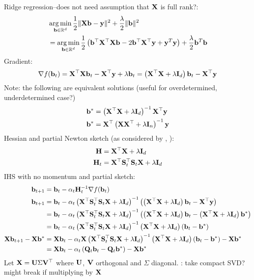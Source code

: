 \documentclass[10pt]{article}
\begin{document}
Ridge regression--does not need assumption that $\mathbf{X}$ is full rank?:
\begin{align*}
&\operatorname*{arg\,min}_{\mathbf{b}\in\mathbb{R}^d} \frac{1}{2}\|\mathbf{X}\mathbf{b}-\mathbf{y}\|^2 + \frac{\lambda}{2}\|\mathbf{b}\|^2 \\
&= \operatorname*{arg\,min}_{\mathbf{b}\in\mathbb{R}^d} \frac{1}{2}\left(\mathbf{b}^\top\mathbf{X}^\top\mathbf{X}\mathbf{b} - 2\mathbf{b}^\top\mathbf{X}^\top\mathbf{y} + \mathbf{y}^T\mathbf{y}\right) + \frac{\lambda}{2}\mathbf{b}^T\mathbf{b} \\
\end{align*}
Gradient:
\[
\nabla f(\mathbf{b}_t) = \mathbf{X}^\top\mathbf{X}\mathbf{b}_t - \mathbf{X}^\top\mathbf{y} + \lambda\mathbf{b}_t = \left(\mathbf{X}^\top\mathbf{X}+\lambda\mathbf{I}_d\right)\mathbf{b}_t - \mathbf{X}^\top\mathbf{y}
\]
Note: the following are equivalent solutions (useful for overdetermined, underdetermined case?)
\begin{align*}
\mathbf{b}^* &= \left(\mathbf{X}^\top\mathbf{X}+\lambda\mathbf{I}_d\right)^{-1}\mathbf{X}^\top\mathbf{y} \\
\mathbf{b}^* &= \mathbf{X}^\top\left(\mathbf{X}\mathbf{X}^\top+\lambda\mathbf{I}_n\right)^{-1}\mathbf{y}
\end{align*}
Hessian and partial Newton sketch (as considered by \citet{Chowdhury:2018}, \citet{Wang:2017}):
\begin{align*}
\mathbf{H} &= \mathbf{X}^\top\mathbf{X}+\lambda\mathbf{I}_d \\
\mathbf{H}_t &= \mathbf{X}^\top\mathbf{S}_t^\top\mathbf{S}_t\mathbf{X} + \lambda\mathbf{I}_d
\end{align*}
IHS with no momentum and partial sketch:
\begin{align*}
\mathbf{b}_{t+1} &= \mathbf{b}_t - \alpha_t\mathbf{H}_t^{-1}\nabla f(\mathbf{b}_t) \\
\mathbf{b}_{t+1} &= \mathbf{b}_t - \alpha_t\left(\mathbf{X}^\top\mathbf{S}_t^\top\mathbf{S}_t\mathbf{X} + \lambda\mathbf{I}_d\right)^{-1}\left(\left(\mathbf{X}^\top\mathbf{X}+\lambda\mathbf{I}_d\right)\mathbf{b}_t-\mathbf{X}^\top\mathbf{y}\right) \\
&= \mathbf{b}_t - \alpha_t\left(\mathbf{X}^\top\mathbf{S}_t^\top\mathbf{S}_t\mathbf{X} + \lambda\mathbf{I}_d\right)^{-1}\left(\left(\mathbf{X}^\top\mathbf{X}+\lambda\mathbf{I}_d\right)\mathbf{b}_t-\left(\mathbf{X}^\top\mathbf{X}+\lambda\mathbf{I}_d\right)\mathbf{b}^*\right) \\
&= \mathbf{b}_t - \alpha_t\left(\mathbf{X}^\top\mathbf{S}_t^\top\mathbf{S}_t\mathbf{X} + \lambda\mathbf{I}_d\right)^{-1}\left(\mathbf{X}^\top\mathbf{X}+\lambda\mathbf{I}_d\right)\left(\mathbf{b}_t-\mathbf{b}^*\right) \\
\mathbf{X}\mathbf{b}_{t+1} - \mathbf{X}\mathbf{b}^* &= \mathbf{X}\mathbf{b}_t - \alpha_t\mathbf{X}\left(\mathbf{X}^\top\mathbf{S}_t^\top\mathbf{S}_t\mathbf{X} + \lambda\mathbf{I}_d\right)^{-1}\left(\mathbf{X}^\top\mathbf{X}+\lambda\mathbf{I}_d\right)\left(\mathbf{b}_t-\mathbf{b}^*\right) - \mathbf{X}\mathbf{b}^* \\
&= \mathbf{X}\mathbf{b}_t - \alpha_t\left(\mathbf{Q}_t\mathbf{b}_t-\mathbf{Q}_t\mathbf{b}^*\right) - \mathbf{X}\mathbf{b}^*
\end{align*}
Let $\mathbf{X} = \mathbf{U}\Sigma\mathbf{V}^\top$ where $\mathbf{U}$, $\mathbf{V}$ orthogonal and $\Sigma$ diagonal. \todo: take compact SVD? might break if multiplying by $\mathbf{X}$
\end{document}
